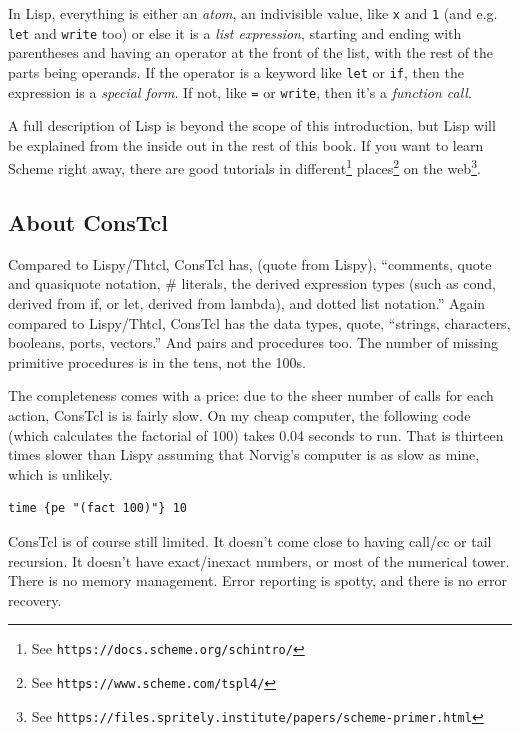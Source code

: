 \documentclass[twoside]{report}
\begin{document}
In Lisp, everything is either an \emph{atom}, an indivisible value, like
\texttt{x} and \texttt{1} (and e.g. \texttt{let} and \texttt{write} too) or
else it is a \emph{list expression}, starting and ending with parentheses and
having an operator at the front of the list, with the rest of the parts being
operands. If the operator is a keyword like \texttt{let} or \texttt{if}, then
the expression is a \emph{special form}. If not, like \texttt{=} or
\texttt{write}, then it's a \emph{function call}.

A full description of Lisp is beyond the scope of this introduction, but Lisp
will be explained from the inside out in the rest of this book. If you want to
learn Scheme right away, there are good tutorials in
different\footnote{See \texttt{https://docs.scheme.org/schintro/}}
places\footnote{See \texttt{https://www.scheme.com/tspl4/}} on the
web\footnote{See
\texttt{https://files.spritely.institute/papers/scheme-primer.html}}.

\subsection{About ConsTcl}
\label{about-constcl}

Compared to Lispy/Thtcl, ConsTcl has, (quote from Lispy), ``comments, quote and
quasiquote notation, \# literals, the derived expression types (such as cond,
derived from if, or let, derived from lambda), and dotted list notation.''
Again compared to Lispy/Thtcl, ConsTcl has the data types, quote, ``strings,
characters, booleans, ports, vectors.'' And pairs and procedures too. The
number of missing primitive procedures is in the tens, not the 100s. 

The completeness comes with a price: due to the sheer number of calls for each
action, ConsTcl is is fairly slow. On my cheap computer, the following code
(which calculates the factorial of 100) takes 0.04 seconds to run. That is thirteen
times slower than Lispy assuming that Norvig's computer is as slow as mine,
which is unlikely.

\begin{verbatim}
time {pe "(fact 100)"} 10
\end{verbatim}

ConsTcl is of course still limited. It doesn't come close to having call/cc or
tail recursion. It doesn't have exact/inexact numbers, or most of the numerical
tower. There is no memory management. Error reporting is spotty, and there is no
error recovery.
\end{document}
